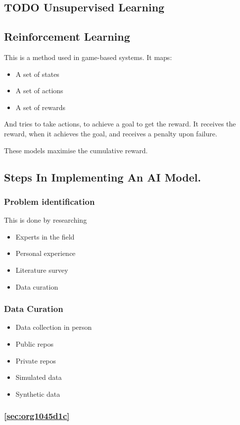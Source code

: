 \documentclass[11pt]{article}
\begin{document}
\subsection{{\bfseries\sffamily TODO} Unsupervised Learning}
\label{sec:orgf3b0bf5}
\subsection{Reinforcement Learning}
\label{sec:org6eab576}
This is a method used in game-based systems.
It maps:
\begin{itemize}
\item A set of states
\item A set of actions
\item A set of rewards
\end{itemize}

And tries to take actions, to achieve a goal to get the reward. It receives the reward, when it achieves the goal, and receives a penalty upon failure.

These models maximise the cumulative reward.
\subsection{Steps In Implementing An AI Model.}
\label{sec:org7738dc2}
\subsubsection{Problem identification}
\label{sec:org15fcfd4}
This is done by researching
\begin{itemize}
\item Experts in the field
\item Personal experience
\item Literature survey
\item Data curation
\end{itemize}
\subsubsection{Data Curation}
\label{sec:org58bc5f8}
\begin{itemize}
\item Data collection in person
\item Public repos
\item Private repos
\item Simulated data
\item Synthetic data
\end{itemize}
\subsubsection{\ref{sec:org1045d1c}}
\label{sec:orga009cda}
\end{document}
